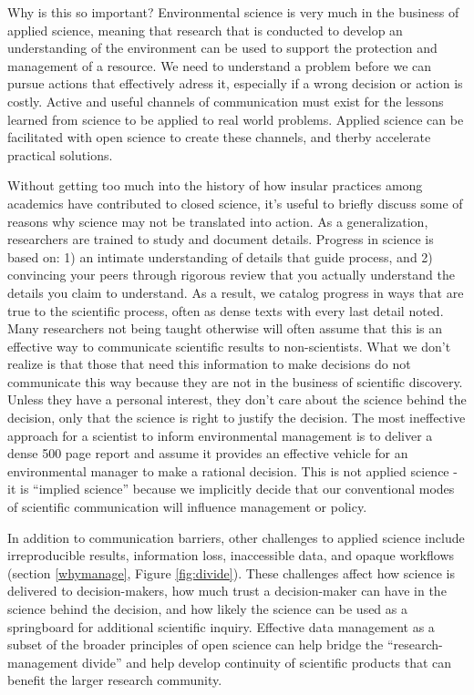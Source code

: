 \documentclass[
]{book}
\begin{document}
Why is this so important? Environmental science is very much in the business of applied science, meaning that research that is conducted to develop an understanding of the environment can be used to support the protection and management of a resource. We need to understand a problem before we can pursue actions that effectively adress it, especially if a wrong decision or action is costly. Active and useful channels of communication must exist for the lessons learned from science to be applied to real world problems. Applied science can be facilitated with open science to create these channels, and therby accelerate practical solutions.

Without getting too much into the history of how insular practices among academics have contributed to closed science, it's useful to briefly discuss some of reasons why science may not be translated into action. As a generalization, researchers are trained to study and document details. Progress in science is based on: 1) an intimate understanding of details that guide process, and 2) convincing your peers through rigorous review that you actually understand the details you claim to understand. As a result, we catalog progress in ways that are true to the scientific process, often as dense texts with every last detail noted. Many researchers not being taught otherwise will often assume that this is an effective way to communicate scientific results to non-scientists. What we don't realize is that those that need this information to make decisions do not communicate this way because they are not in the business of scientific discovery. Unless they have a personal interest, they don't care about the science behind the decision, only that the science is right to justify the decision. The most ineffective approach for a scientist to inform environmental management is to deliver a dense 500 page report and assume it provides an effective vehicle for an environmental manager to make a rational decision. This is not applied science - it is ``implied science'' because we implicitly decide that our conventional modes of scientific communication will influence management or policy.

In addition to communication barriers, other challenges to applied science include irreproducible results, information loss, inaccessible data, and opaque workflows (section \ref{whymanage}, Figure \ref{fig:divide}). These challenges affect how science is delivered to decision-makers, how much trust a decision-maker can have in the science behind the decision, and how likely the science can be used as a springboard for additional scientific inquiry. Effective data management as a subset of the broader principles of open science can help bridge the ``research-management divide'' and help develop continuity of scientific products that can benefit the larger research community.
\end{document}
